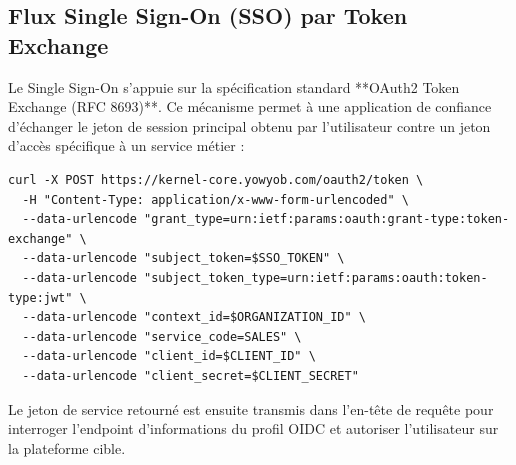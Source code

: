 \subsection{Flux Single Sign-On (SSO) par Token Exchange}
Le Single Sign-On s'appuie sur la spécification standard **OAuth2 Token Exchange (RFC 8693)**. Ce mécanisme permet à une application de confiance d'échanger le jeton de session principal obtenu par l'utilisateur contre un jeton d'accès spécifique à un service métier :
\begin{lstlisting}[caption={Payload d'échange auprès de /oauth2/token}]
curl -X POST https://kernel-core.yowyob.com/oauth2/token \
  -H "Content-Type: application/x-www-form-urlencoded" \
  --data-urlencode "grant_type=urn:ietf:params:oauth:grant-type:token-exchange" \
  --data-urlencode "subject_token=$SSO_TOKEN" \
  --data-urlencode "subject_token_type=urn:ietf:params:oauth:token-type:jwt" \
  --data-urlencode "context_id=$ORGANIZATION_ID" \
  --data-urlencode "service_code=SALES" \
  --data-urlencode "client_id=$CLIENT_ID" \
  --data-urlencode "client_secret=$CLIENT_SECRET"
\end{lstlisting}
Le jeton de service retourné est ensuite transmis dans l'en-tête de requête  pour interroger l'endpoint d'informations du profil OIDC  et autoriser l'utilisateur sur la plateforme cible.

